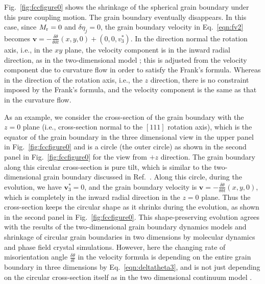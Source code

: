 Fig.~\ref{fig:fccfigure0} shows the shrinkage of the spherical grain boundary under this pure coupling motion. The grain boundary eventually disappears. In this case, since $M_{\rm r}=0$ and $\delta \eta_j=0$, the grain boundary velocity in Eq.~\eqref{eqn:fv2} becomes $\mathbf v =-\frac{\delta \theta}{\theta\delta t}(x,y,0)+(0,0, v^*_3)$. In the direction normal the rotation axis, i.e., in the $xy$ plane, the velocity component is in the inward radial direction, as in the two-dimensional model \cite{zhang2018motion,zhang2019new}; this is adjusted from the velocity component due to curvature flow in order to satisfy the Frank's formula. Whereas in the direction of the rotation axis, i.e., the $z$ direction, there is no constraint imposed by the Frank's formula, and the velocity component is
the same as that in the curvature flow.

As an example, we consider the cross-section of the grain boundary with the $z=0$ plane (i.e., cross-section normal to the $[111]$ rotation axis), which is the equator of the grain boundary in the three dimensional view in the upper panel in Fig.~\ref{fig:fccfigure0} and is a circle (the outer circle) as shown  in the second panel in Fig.~\ref{fig:fccfigure0} for the view from $+z$ direction. The grain boundary along this circular cross-section is pure tilt, which is similar to the two-dimensional grain boundary discussed in Ref.~\cite{zhang2018motion,zhang2019new}. Along this circle, during the evolution, we have $\mathbf v^*_3=0$, and the grain boundary velocity is $\mathbf v =-\frac{\delta \theta}{\theta\delta t}(x,y,0)$, which is completely in the inward radial direction in the $z=0$ plane. Thus the cross-section keeps the circular shape as it shrinks during the evolution, as shown in the  second panel in Fig.~\ref{fig:fccfigure0}.
This shape-preserving evolution agrees with the results of the two-dimensional grain boundary dynamics models \cite{Taylor2007,zhang2018motion,zhang2019new} and shrinkage of circular grain boundaries in two dimensions by molecular dynamics \cite{srinivasan2002challenging} and phase field crystal \cite{wu2012phase} simulations. However, here the changing rate of misorientation angle $\frac{\delta \theta}{\delta t}$ in the velocity formula is depending on the entire grain boundary in three dimensions by Eq.~\eqref{eqn:deltatheta3}, and is not just depending on the circular cross-section itself as in the two dimensional continuum model \cite{zhang2019new}.

